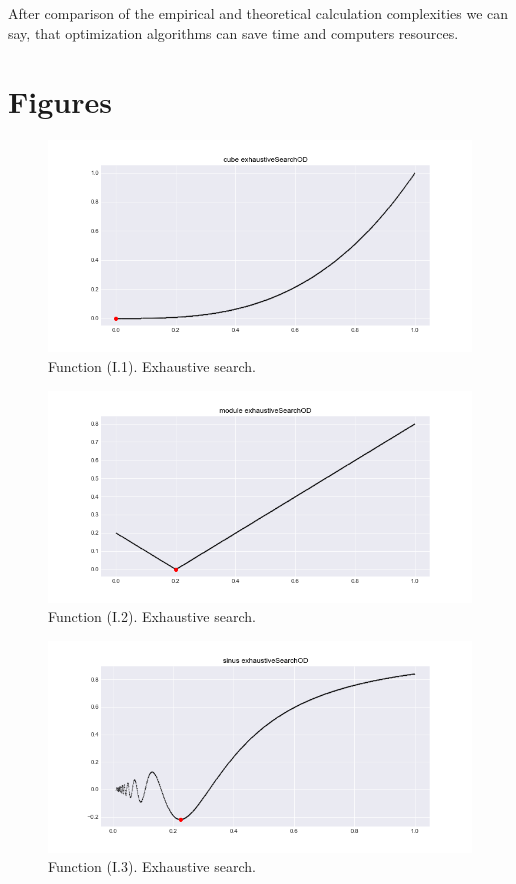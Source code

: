 \documentclass[a4paper,article,14pt]{extarticle}
\begin{document}
	After comparison of the empirical and theoretical calculation complexities we can say, that optimization algorithms can save time and computers resources. 
	
	\newpage
	\section{Figures}
	
	\begin{figure}[h]
		\centering
		\includegraphics[scale=0.5]{cube_exhaustiveSearchOD.png}
		\caption{Function (I.1). Exhaustive search.}
		\label{cubeEx}
	\end{figure} 
	\begin{figure}[h]
		\centering
		\includegraphics[scale=0.5]{module_exhaustiveSearchOD.png}
		\caption{Function (I.2). Exhaustive search.}
		\label{moduleEx}
	\end{figure} 
	\begin{figure}[h]
		\centering
		\includegraphics[scale=0.5]{sinus_exhaustiveSearchOD.png}
		\caption{Function (I.3). Exhaustive search.}
		\label{sinEx}
	\end{figure} 
\end{document}
